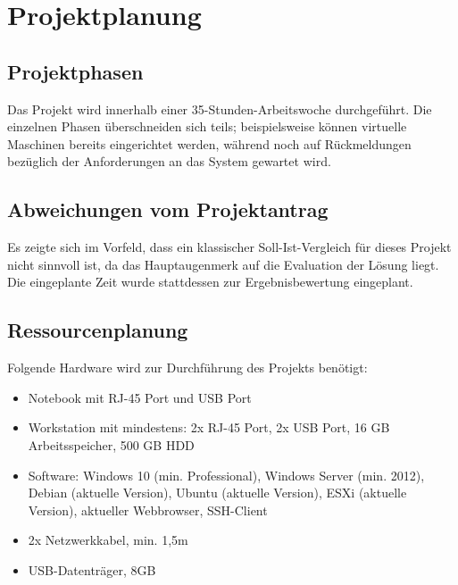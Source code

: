 \section{Projektplanung} 
\label{sec:Projektplanung}

\subsection{Projektphasen}
\label{sec:Projektphasen}
Das Projekt wird innerhalb einer 35-Stunden-Arbeitswoche durchgeführt. Die einzelnen Phasen überschneiden sich teils; beispielsweise können virtuelle Maschinen bereits eingerichtet werden, während noch auf Rückmeldungen bezüglich der Anforderungen an das System gewartet wird. 

\subsection{Abweichungen vom Projektantrag}
\label{sec:AbweichungenProjektantrag}
Es zeigte sich im Vorfeld, dass ein klassischer Soll-Ist-Vergleich für dieses Projekt nicht sinnvoll ist, da das Hauptaugenmerk auf die Evaluation der Lösung liegt. Die eingeplante Zeit wurde stattdessen zur Ergebnisbewertung eingeplant.

\subsection{Ressourcenplanung}
\label{sec:Ressourcenplanung}
Folgende Hardware wird zur Durchführung des Projekts benötigt:
\begin{itemize}
  \item Notebook mit RJ-45 Port und USB Port
  \item Workstation mit mindestens: 2x RJ-45 Port, 2x USB Port, 16 GB Arbeitsspeicher, 500 GB HDD
  \item Software: Windows 10 (min. Professional), Windows Server (min. 2012), Debian (aktuelle Version), Ubuntu (aktuelle Version), ESXi (aktuelle Version), aktueller Webbrowser, SSH-Client
  \item 2x Netzwerkkabel, min. 1,5m
  \item USB-Datenträger, 8GB
\end{itemize}